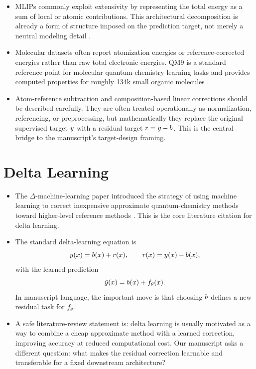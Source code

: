 \documentclass[11pt]{article}
\begin{document}
\begin{itemize}
  \item MLIPs commonly exploit extensivity by representing the total energy as a sum of local or atomic contributions. This architectural decomposition is already a form of structure imposed on the prediction target, not merely a neutral modeling detail \cite{behler2007generalized,schutt2017schnet}.

  \item Molecular datasets often report atomization energies or reference-corrected energies rather than raw total electronic energies. QM9 is a standard reference point for molecular quantum-chemistry learning tasks and provides computed properties for roughly 134k small organic molecules \cite{ramakrishnan2014quantum}.

  \item Atom-reference subtraction and composition-based linear corrections should be described carefully. They are often treated operationally as normalization, referencing, or preprocessing, but mathematically they replace the original supervised target \(y\) with a residual target \(r = y - b\). This is the central bridge to the manuscript's target-design framing.
\end{itemize}

\section{Delta Learning}

\begin{itemize}
  \item The \(\Delta\)-machine-learning paper introduced the strategy of using machine learning to correct inexpensive approximate quantum-chemistry methods toward higher-level reference methods \cite{ramakrishnan2015delta}. This is the core literature citation for delta learning.

  \item The standard delta-learning equation is
  \[
    y(x) = b(x) + r(x),
    \qquad
    r(x) = y(x) - b(x),
  \]
  with the learned prediction
  \[
    \hat{y}(x) = b(x) + f_{\theta}(x).
  \]
  In manuscript language, the important move is that choosing \(b\) defines a new residual task for \(f_{\theta}\).

  \item A safe literature-review statement is: delta learning is usually motivated as a way to combine a cheap approximate method with a learned correction, improving accuracy at reduced computational cost. Our manuscript asks a different question: what makes the residual correction learnable and transferable for a fixed downstream architecture?
\end{itemize}
\end{document}
